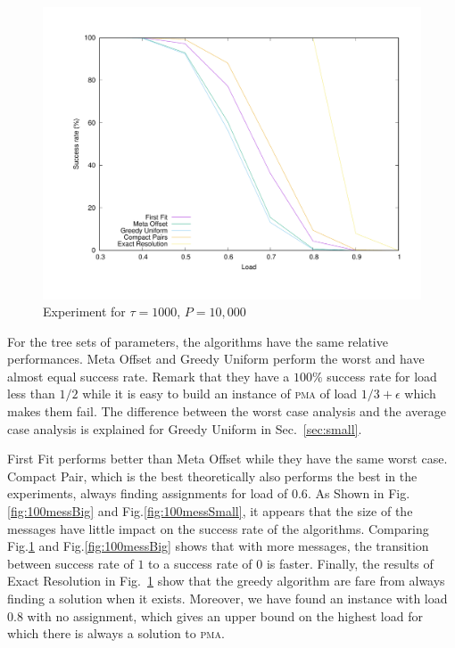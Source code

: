 \documentclass[a4paper,UKenglish,cleveref, autoref, thm-restate]{lipics-v2019}
\newcommand\pma{\textsc{pma}\xspace}
\begin{document}
\begin{figure}
\begin{center}
\includegraphics[scale=0.3]{10mess}
\end{center}
\caption{Experiment for $\tau = 1000$, $P=10,000$}
\label{fig:10mess}
\end{figure}

For the tree sets of parameters, the algorithms have the same relative performances. Meta Offset and Greedy Uniform
perform the worst and have almost equal success rate. Remark that they have a $100\%$ success rate for load
less than $1/2$ while it is easy to build an instance of \pma of load $1/3 +\epsilon$ which makes them fail. 
The difference between the worst case analysis and the average case analysis is explained for Greedy Uniform in Sec.~\ref{sec:small}.

First Fit performs better than Meta Offset while they have the same worst case.  Compact Pair, which is the best theoretically also performs the best in the experiments, always finding assignments for load of 
$0.6$. As Shown in Fig.\ref{fig:100messBig} and Fig.\ref{fig:100messSmall}, it appears that the size of the messages have little impact on the success rate of the algorithms. Comparing Fig.\ref{fig:10mess} and Fig.\ref{fig:100messBig} shows that with more messages, the transition between success rate of $1$ to a success rate of $0$ is faster.
Finally, the results of Exact Resolution in Fig.~\ref{fig:10mess} show that the greedy algorithm are fare from always finding 
a solution when it exists. Moreover, we have found an instance with load $0.8$ with no assignment, which gives an upper bound on the highest load for which there is always a solution to \pma.
\end{document}
